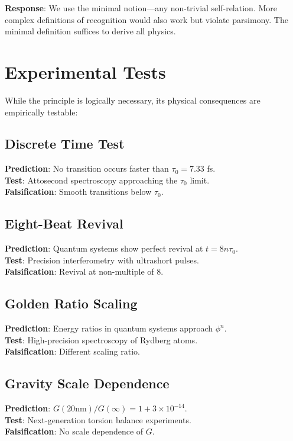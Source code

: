 \documentclass[12pt,a4paper]{article}
\begin{document}
\textbf{Response}: We use the minimal notion---any non-trivial self-relation. More complex definitions of recognition would also work but violate parsimony. The minimal definition suffices to derive all physics.

\section{Experimental Tests}

While the principle is logically necessary, its physical consequences are empirically testable:

\subsection{Discrete Time Test}
\textbf{Prediction}: No transition occurs faster than $\tau_0 = 7.33$ fs.\\
\textbf{Test}: Attosecond spectroscopy approaching the $\tau_0$ limit.\\
\textbf{Falsification}: Smooth transitions below $\tau_0$.

\subsection{Eight-Beat Revival}
\textbf{Prediction}: Quantum systems show perfect revival at $t = 8n\tau_0$.\\
\textbf{Test}: Precision interferometry with ultrashort pulses.\\
\textbf{Falsification}: Revival at non-multiple of 8.

\subsection{Golden Ratio Scaling}
\textbf{Prediction}: Energy ratios in quantum systems approach $\phi^n$.\\
\textbf{Test}: High-precision spectroscopy of Rydberg atoms.\\
\textbf{Falsification}: Different scaling ratio.

\subsection{Gravity Scale Dependence}
\textbf{Prediction}: $G(20\text{nm})/G(\infty) = 1 + 3\times10^{-14}$.\\
\textbf{Test}: Next-generation torsion balance experiments.\\
\textbf{Falsification}: No scale dependence of $G$.
\end{document}
